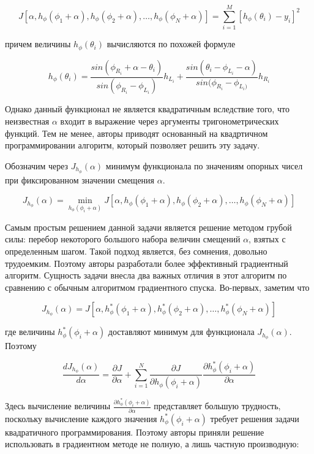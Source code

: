 \documentclass[a4paper,12pt, titlepage]{article}
\begin{document}
$$
J[\alpha, h_{\phi}(\phi_{1} + \alpha), h_{\phi}(\phi_{2} + \alpha), \ldots,
h_{\phi}(\phi_{N} + \alpha)] =
\sum \limits_{i = 1}^{M}[h_{\phi}(\theta_{i}) - y_{i}]^{2}
$$

причем величины $h_{\phi}(\theta_{i})$ вычисляются по похожей формуле

$$
h_{\phi}(\theta_{i}) =
\frac{sin(\phi_{R_{i}} + \alpha - \theta_{i})}{sin(\phi_{R_{i}} - \phi_{L_{i}})}
h_{L_{i}} +
\frac{sin(\theta_{i} - \phi_{L_{i}} - \alpha)}{sin(\phi_{R_{i}} - \phi_{L_{i})}}
h_{R_{i}}
$$

Однако данный функционал не является квадратичным вследствие того, что
неизвестная $\alpha$ входит в выражение через аргументы тригонометрических
функций. Тем не менее, авторы приводят основанный на квадртичном 
программировании алгоритм, который позволяет решить эту задачу.

Обозначим через $J_{h_{\phi}}(\alpha)$ минимум функционала по значениям опорных 
чисел при фиксированном значении смещения $\alpha$.

$$
J_{h_{\phi}}(\alpha) = \min_{{h_{\phi}(\phi_{i} + \alpha)}} J[\alpha,
h_{\phi}(\phi_{1} + \alpha), h_{\phi}(\phi_{2} + \alpha), \ldots,
h_{\phi}(\phi_{N} + \alpha)]
$$

Самым простым решением данной задачи является решение методом грубой
силы: перебор некоторого большого набора величин смещений $\alpha$, взятых с
определенным шагом. Такой подход является, без сомнения, довольно трудоемким.
Поэтому авторы разработали более эффективный градиентный алгоритм. Сущность
задачи внесла два важных отличия в этот алгоритм по сравнению с обычным
алгоритмом градиентного спуска. Во-первых, заметим что

$$
J_{h_{\phi}}(\alpha) = J[\alpha,
h_{\phi}^{*}(\phi_{1} + \alpha), h_{\phi}^{*}(\phi_{2} + \alpha), \ldots,
h_{\phi}^{*}(\phi_{N} + \alpha)]
$$

где величины $h_{\phi}^{*}(\phi_{i} + \alpha)$ доставляют минимум для
функционала $J_{h_{\phi}}(\alpha)$. Поэтому

$$
\frac{d J_{h_{\phi}}(\alpha)}{d \alpha} = \frac{\partial J}{\partial \alpha} +
\sum \limits_{i = 1}^{N} \frac{\partial J}{\partial h_{\phi}(\phi_{i} + \alpha)}
\frac{\partial h_{\phi}^{*}(\phi_{i} + \alpha) }{\partial \alpha}
$$

Здесь вычисление величины
$\frac{\partial h_{\phi}^{*}(\phi_{i} + \alpha)}{\partial \alpha}$ представляет
большую трудность, поскольку вычисление каждого значения
$h_{\phi}^{*}(\phi_{i} + \alpha)$ требует решения задачи квадратичного
программирования. Поэтому авторы приняли решение использовать в градиентном
методе не полную, а лишь частную производную:
\end{document}
